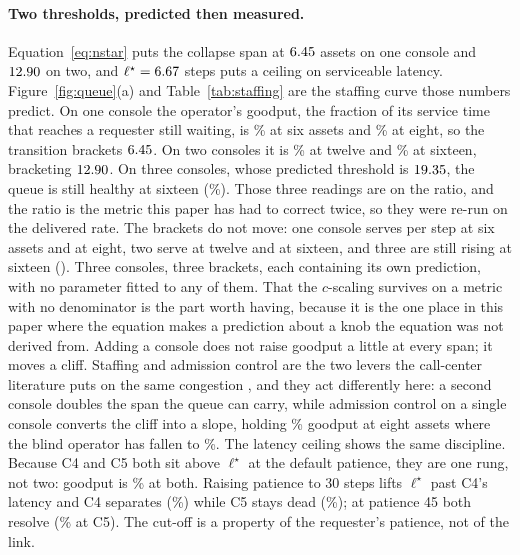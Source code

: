 \documentclass[11pt]{article}
\begin{document}
\paragraph{Two thresholds, predicted then measured.} Equation~\ref{eq:nstar} puts the collapse span at $6.45{}$ assets on one console and $12.90{}$ on two, and $\ell^{\star} = 6.67{}$ steps puts a ceiling on serviceable latency. Figure~\ref{fig:queue}(a) and Table~\ref{tab:staffing} are the staffing curve those numbers predict. On one console the operator's goodput, the fraction of its service time that reaches a requester still waiting, is \qGoodOneSix\% at six assets and \qGoodOneEight\% at eight, so the transition brackets $6.45{}$. On two consoles it is \qGoodTwoTwelve\% at twelve and \qGoodTwoSixteen\% at sixteen, bracketing $12.90{}$. On three consoles, whose predicted threshold is $19.35{}$, the queue is still healthy at sixteen (\qGoodThreeSixteen\%). Those three readings are on the ratio, and the ratio is the metric this paper has had to correct twice, so they were re-run on the delivered rate. The brackets do not move: one console serves \seSrvOneNSix{} per step at six assets and \seSrvOneNEight{} at eight, two serve \seSrvTwoNTwelve{} at twelve and \seSrvTwoNSixteen{} at sixteen, and three are still rising at sixteen (\seSrvThreeNSixteen{}). Three consoles, three brackets, each containing its own prediction, with no parameter fitted to any of them. That the $c$-scaling survives on a metric with no denominator is the part worth having, because it is the one place in this paper where the equation makes a prediction about a knob the equation was not derived from. Adding a console does not raise goodput a little at every span; it moves a cliff. Staffing and admission control are the two levers the call-center literature puts on the same congestion \citep{ibrahim2018announcements}, and they act differently here: a second console doubles the span the queue can carry, while admission control on a single console converts the cliff into a slope, holding \qGoodOneEightAdmit\% goodput at eight assets where the blind operator has fallen to \qGoodOneEight\%. The latency ceiling shows the same discipline. Because C4 and C5 both sit above $\ell^{\star}$ at the default patience, they are one rung, not two: goodput is \qPatShortCfour\% at both. Raising patience to 30 steps lifts $\ell^{\star}$ past C4's latency and C4 separates (\qPatMidCfour\%) while C5 stays dead (\qPatMidCfive\%); at patience 45 both resolve (\qPatLongCfive\% at C5). The cut-off is a property of the requester's patience, not of the link.
\end{document}
